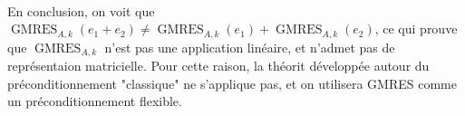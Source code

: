 \paragraph{}
En conclusion, on voit que $\operatorname{GMRES}_{A, k}\left(e_1 + e_2\right) \neq \operatorname{GMRES}_{A, k}\left(e_1\right) + \operatorname{GMRES}_{A, k}\left(e_2\right)$, ce qui prouve que $\operatorname{GMRES}_{A, k}$ n'est pas une application linéaire, et n'admet pas de représentaion matricielle.
Pour cette raison, la théorit développée autour du préconditionnement "classique" ne s'applique pas, et on utilisera GMRES comme un préconditionnement flexible.
